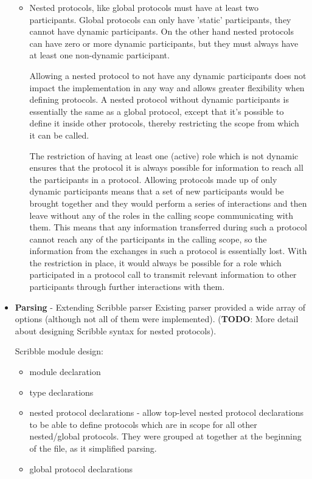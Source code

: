 \documentclass[12pt,twoside]{report}
\begin{document}
\begin{itemize}
\begin{itemize}
        \item Nested protocols, like global protocols must have at least two participants. Global protocols can only have 'static' participants, they cannot have dynamic participants. On the other hand nested protocols can have zero or more dynamic participants, but they must always have at least one non-dynamic participant. 
        
        Allowing a nested protocol to not have any dynamic participants does not impact the implementation in any way and allows greater flexibility when defining protocols. A nested protocol without dynamic participants is essentially the same as a global protocol, except that it's possible to define it inside other protocols, thereby restricting the scope from which it can be called.
        
        The restriction of having at least one (active) role which is not dynamic ensures that the protocol it is always possible for information to reach all the participants in a protocol. Allowing protocols made up of only dynamic participants means that a set of new participants would be brought together and they would perform a series of interactions and then leave without any of the roles in the calling scope communicating with them. This means that any information transferred during such a protocol cannot reach any of the participants in the calling scope, so the information from the exchanges in such a protocol is essentially lost. With the restriction in place, it would always be possible for a role which participated in a protocol call to transmit relevant information to other participants through further interactions with them.
    \end{itemize}
    
    \item \textbf{Parsing} - Extending Scribble parser
    Existing parser provided a wide array of options (although not all of them were implemented). (\textbf{TODO}: More detail about designing Scribble syntax for nested protocols).
    
    Scribble module design:
    \begin{itemize}
        \item module declaration
        \item type declarations
        \item nested protocol declarations - allow top-level nested protocol declarations to be able to define protocols which are in scope for all other nested/global protocols. They were grouped at together at the beginning of the file, as it simplified parsing.
        \item global protocol declarations
    \end{itemize}
    

\end{itemize}
\end{document}
